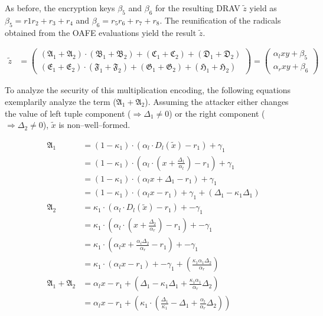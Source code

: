 \noindent{}As before, the encryption keys $\beta_5$ and $\beta_6$ for the
resulting DRAV $\widetilde{z}$ yield as $\beta_5 = r1r_2 + r_3 + r_4$ and
$\beta_6 = r_5r_6 + r_7 + r_8$. The reunification of the radicals obtained from
the OAFE evaluations yield the result $\widetilde{z}$.

\begin{align*}
  \widetilde{z} & =
  \begin{pmatrix}%
    (\mathfrak{A}_1+\mathfrak{A}_2) \cdot
    (\mathfrak{B}_1+\mathfrak{B}_2) +
    (\mathfrak{C}_1+\mathfrak{C}_2) +
    (\mathfrak{D}_1+\mathfrak{D}_2)\\
    (\mathfrak{E}_1+\mathfrak{E}_2) \cdot
    (\mathfrak{F}_1+\mathfrak{F}_2) +
    (\mathfrak{G}_1+\mathfrak{G}_2) +
    (\mathfrak{H}_1+\mathfrak{H}_2)
  \end{pmatrix}
   =
   \begin{pmatrix}
     \alpha_l xy + \beta_5 \\
     \alpha_r xy + \beta_6
   \end{pmatrix}
\end{align*}

\noindent{}To analyze the security of this multiplication encoding, the
following equations exemplarily analyze the term ($\mathfrak{A}_1 +
\mathfrak{A}_2$). Assuming the attacker either changes the value of left tuple
component ($\Rightarrow \Delta_1 \neq 0$) or the right component ($\Rightarrow
\Delta_2 \neq 0$), $\widetilde{x}$ is non--well--formed.

\begin{align*}
%
  \mathfrak{A}_1 &=
  (1 - \kappa_1) \cdot
  (\alpha_l \cdot D_l(\widetilde{x}) - r_1) +
  \gamma_1 \\
  & =
  (1 - \kappa_1) \cdot
  \left(\alpha_l \cdot \left(x + \frac{\Delta_1}{\alpha_l}\right) - r_1\right) +
  \gamma_1 \\
  & =
  (1 - \kappa_1) \cdot
  \left(\alpha_l x + \Delta_1 - r_1\right) +
  \gamma_1 \\
  & =
  (1 - \kappa_1) \cdot
  \left(\alpha_l x - r_1\right) +
  \gamma_1 +
  (\Delta_1 - \kappa_1\Delta_1)\\
  \mathfrak{A}_2 &=
  \kappa_1 \cdot
  (\alpha_l \cdot D_l(\widetilde{x}) - r_1) +
  -\gamma_1 \\
  & =
  \kappa_1 \cdot
  \left(\alpha_l \cdot \left(x + \frac{\Delta_2}{\alpha_r}\right) - r_1\right) +
  -\gamma_1 \\
  & =
  \kappa_1 \cdot
  \left(\alpha_l x + \frac{\alpha_l\Delta_2}{\alpha_r} - r_1\right) +
  -\gamma_1 \\
  & =
  \kappa_1 \cdot
  \left(\alpha_l x - r_1\right) +
  -\gamma_1 +
  \left(\frac{\kappa_1\alpha_1\Delta_2}{\alpha_r}\right)\\
\mathfrak{A}_1 + \mathfrak{A}_2 &=
  \alpha_l x - r_1 +
  \left(
    \Delta_1 - \kappa_1\Delta_1 +
    \frac{\kappa_1\alpha_1}{\alpha_r}\Delta_2
  \right)\\
  &=
  \alpha_l x - r_1 +
  \left(
    \kappa_1 \cdot \left(\frac{\Delta_1}{\kappa_1} - \Delta_1 +
    \frac{\alpha_l}{\alpha_r}\Delta_2\right)
  \right)\\
%
\end{align*}

